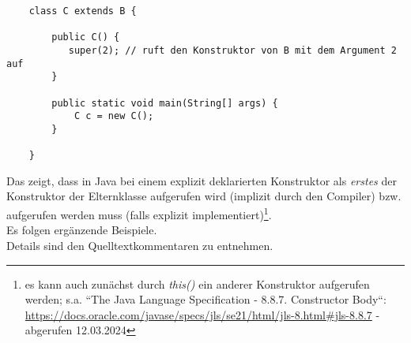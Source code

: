\begin{verbatim}
    class C extends B {

        public C() {
           super(2); // ruft den Konstruktor von B mit dem Argument 2 auf
        }

        public static void main(String[] args) {
            C c = new C();
        }

    }
\end{verbatim}

\noindent
Das zeigt, dass in Java bei einem explizit deklarierten Konstruktor als \textit{erstes}
der Konstruktor der Elternklasse aufgerufen wird (implizit durch den Compiler) bzw. aufgerufen werden muss (falls explizit implementiert)\footnote{
    es kann auch zunächst durch \textit{this()} ein anderer Konstruktor aufgerufen werden; s.a.
    ``The Java Language Specification - 8.8.7. Constructor Body``: \url{https://docs.oracle.com/javase/specs/jls/se21/html/jls-8.html#jls-8.8.7} - abgerufen 12.03.2024
}.\\

\noindent
Es folgen ergänzende Beispiele.\\
Details sind den Quelltextkommentaren zu entnehmen.

